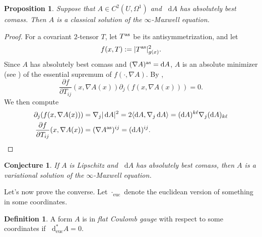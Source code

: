 \documentclass[reqno,11pt]{amsart}
\newcommand*\dif{\mathop{}\!\mathrm{d}}
\newcommand{\dfn}[1]{\emph{#1}\index{#1}}
\newcommand{\euc}{\mathrm{euc}}
\newtheorem{proposition}[theorem]{Proposition}
\newtheorem{conjecture}[theorem]{Conjecture}
\theoremstyle{definition}
\newtheorem{definition}[theorem]{Definition}
\numberwithin{equation}{section}
\begin{document}
\begin{proposition}
Suppose that $A \in C^2(U, \Omega^1)$ and $\dif A$ has absolutely best comass.
Then $A$ is a classical solution of the $\infty$-Maxwell equation.
\end{proposition}
\begin{proof}
For a covariant $2$-tensor $T$, let $T^{\rm as}$ be its antisymmetrization, and let
$$f(x, T) := |T^{\rm as}|_{g(x)}^2.$$
Since $A$ has absolutely best comass and $(\nabla A)^{\rm as} = \dif A$, $A$ is an absolute minimizer (see \cite[Definition 5.1]{Barron2001}) of the essential supremum of $f(\cdot, \nabla A)$.
By \cite[Theorem 5.2]{Barron2001},
\begin{equation}\label{ELA}
	\frac{\partial f}{\partial T_{ij}}(x, \nabla A(x)) \partial_j (f(x, \nabla A(x))) = 0.
\end{equation}
We then compute
\begin{align*}
\partial_j (f(x, \nabla A(x))) &= \nabla_j |\dif A|^2 = 2 \langle \dif A, \nabla_j \dif A\rangle = (\dif A)^{k\ell} \nabla_j (\dif A)_{k\ell} \\
\frac{\partial f}{\partial T_{ij}}(x, \nabla A(x)) &= (\nabla A^{\rm as})^{ij} = (\dif A)^{ij}. \qedhere
\end{align*}
\end{proof}

\begin{conjecture}
If $A$ is Lipschitz and $\dif A$ has absolutely best comass, then $A$ is a variational solution of the $\infty$-Maxwell equation.
\end{conjecture}

Let's now prove the converse.
Let $\cdot_\euc$ denote the euclidean version of something in some coordinates.

\begin{definition}
A form $A$ is in \dfn{flat Coulomb gauge} with respect to some coordinates if $\dif^*_\euc A = 0$.
\end{definition}
\end{document}
